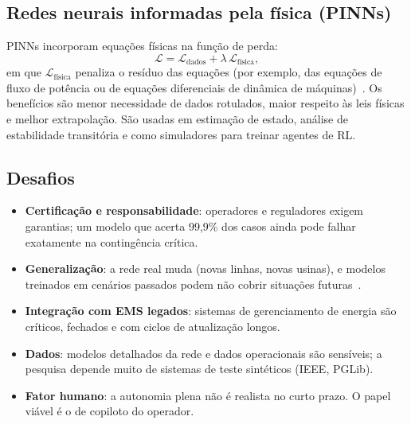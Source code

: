 \documentclass[11pt,a4paper]{article}
\begin{document}
\subsection{Redes neurais informadas pela física (PINNs)}

PINNs incorporam equações físicas na função de perda:
\begin{equation}
  \mathcal{L} = \mathcal{L}_{\text{dados}} + \lambda\, \mathcal{L}_{\text{física}},
\end{equation}
em que $\mathcal{L}_{\text{física}}$ penaliza o resíduo das equações (por
exemplo, das equações de fluxo de potência ou de equações diferenciais de
dinâmica de máquinas)~\cite{pinn}. Os benefícios são menor necessidade de dados
rotulados, maior respeito às leis físicas e melhor extrapolação. São usadas em
estimação de estado, análise de estabilidade transitória e como simuladores
para treinar agentes de RL.

\subsection{Desafios}
\begin{itemize}
  \item \textbf{Certificação e responsabilidade}: operadores e reguladores
    exigem garantias; um modelo que acerta 99,9\% dos casos ainda pode falhar
    exatamente na contingência crítica.
  \item \textbf{Generalização}: a rede real muda (novas linhas, novas
    usinas), e modelos treinados em cenários passados podem não cobrir
    situações futuras~\cite{gridgeneralization}.
  \item \textbf{Integração com EMS legados}: sistemas de gerenciamento de
    energia são críticos, fechados e com ciclos de atualização longos.
  \item \textbf{Dados}: modelos detalhados da rede e dados operacionais são
    sensíveis; a pesquisa depende muito de sistemas de teste sintéticos (IEEE,
    PGLib).
  \item \textbf{Fator humano}: a autonomia plena não é realista no curto
    prazo. O papel viável é o de copiloto do operador.
\end{itemize}
\end{document}

